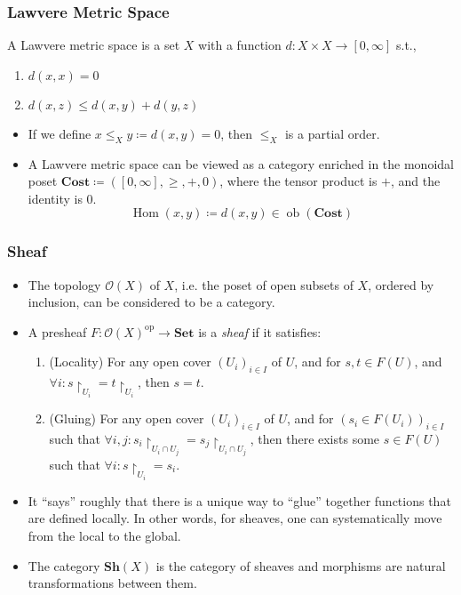 \documentclass[UTF8,11pt,colorlinks,compress,openany]{beamer}%
\begin{document}
\begin{frame}\frametitle{Lawvere Metric Space}
\begin{definition}
	A Lawvere metric space is a set $X$ with a function $d:X\times X\to [0,\infty]$ s.t.,
	\begin{enumerate}
		\item $d(x,x)=0$
		\item $d(x,z)\leq d(x,y)+d(y,z)$
	\end{enumerate}
\end{definition}
\begin{itemize}
	\item If we define $x\leq_X y\coloneqq d(x,y)=0$, then $\leq_X$ is a partial order.
	\item A Lawvere metric space can be viewed as a category enriched in the monoidal poset $\mathbf{Cost}\coloneqq ([0,\infty],\geq,+,0)$, where the tensor product is $+$, and the identity is $0$.
\[\operatorname{Hom}(x,y)\coloneqq d(x,y)\in \operatorname{ob}(\mathbf{Cost})\]
\end{itemize}
\end{frame}

\begin{frame}\frametitle{Sheaf}
\begin{itemize}
	\item The topology $\mathcal{O}(X)$ of $X$, i.e. the poset of open subsets of $X$, ordered by inclusion, can be considered to be a category.
	\item A presheaf $F: \mathcal{O}(X)^{\mathrm{op}}\to\mathbf{Set}$ is a \emph{sheaf} if it satisfies:
	\begin{enumerate}
		\item (Locality) For any open cover $(U_i)_{i\in I}$ of $U$, and for $s,t\in F(U)$, and $\forall i: s{\restriction_{U_i}}=t{\restriction_{U_i}}$, then $s=t$.
		\item (Gluing) For any open cover $(U_i)_{i\in I}$ of $U$, and for $\left(s_i\in F(U_i)\right)_{i\in I}$ such that $\forall i,j: s_i{\restriction_{U_i\cap U_j}}=s_j{\restriction_{U_i\cap U_j}}$, then there exists some $s\in F(U)$ such that $\forall i: s{\restriction_{U_i}}=s_i$.
	\end{enumerate}
	\item It ``says'' roughly that there is a unique way to ``glue'' together functions that are defined locally. In other words, for sheaves, one can systematically move from the local to the global.
	\item The category $\mathbf{Sh}(X)$ is the category of sheaves and morphisms are natural transformations between them.
\end{itemize}
\end{frame}
\end{document}
